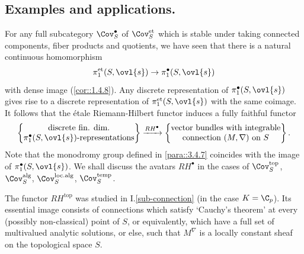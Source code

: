 \subsection{Examples and applications.}\label{sub::3.5} 

\begin{para}\label{para::3.5.1} For any full subcategory $\Cov^\bullet_S$ of
 $\Cov^{\mathrm{et}}_S$ which is stable under 
 taking connected components, fiber products  and quotients, we have seen
 that there is a natural continuous homomorphism 
 \begin{equation*}
  \pi_1^{\mathrm{et}}(S, \ovl{s})\to \pi_1^\bullet(S, \ovl{s}) 
 \end{equation*}
 with dense image (\ref{cor::1.4.8}). Any discrete representation
 of $ \pi_1^\bullet(S, \ovl{s})$ gives rise to a 
 discrete representation of $ \pi_1^{\mathrm{et}}(S, \ovl{s})$ with the
 same coimage. It follows that the \'etale Riemann-Hilbert 
 functor induces a fully faithful functor 
 \begin{equation*}
  \left\{
   \begin{matrix}
    \text{discrete fin. dim.}\\
    \text{$\pi_1^\bullet(S,\ovl{s})$-representations}
   \end{matrix}
   \right\}
   \xrightarrow{RH^\bullet}
   \left\{
    \begin{matrix}
     \text{vector bundles with integrable}\\
     \text{connection $(M,\nabla)$ on $S$}
    \end{matrix}
   \right\}.
 \end{equation*}
 Note that the monodromy group defined in \ref{para::3.4.7} coincides
 with the image 
 of $\pi_1^\bullet(S, \ovl{s})$.  We shall discuss the avatars
 $RH^\bullet$ in the cases of $\Cov^{\mathrm{top}}_S$,
 $\Cov^{\mathrm{alg}}_S$, $\Cov^{\mathrm{loc.alg}}_S$,
 $\Cov^{\mathrm{temp}}_S$.
\end{para}

\begin{para}\label{para::3.5.2} The functor $RH^{\mathrm{top}}$ was studied in
 I.\ref{sub-connection} (in the case $K=\C_p$). Its essential image consists 
 of connections which satisfy `Cauchy's theorem' at every (possibly
 non-classical) point of $S$, or equivalently, which have a full set of
 multivalued analytic solutions, or else, such that 
 $M^\nabla$ is a locally constant sheaf on the topological space $S$.
\end{para}

